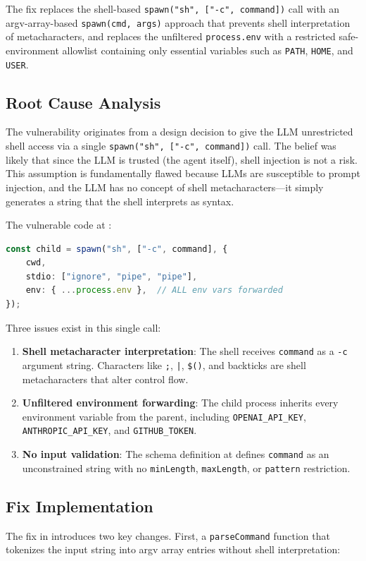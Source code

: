 The fix replaces the shell-based \texttt{spawn("sh", ["-c", command])} call with an argv-array-based \texttt{spawn(cmd, args)} approach that prevents shell interpretation of metacharacters, and replaces the unfiltered \texttt{process.env} with a restricted safe-environment allowlist containing only essential variables such as \texttt{PATH}, \texttt{HOME}, and \texttt{USER}.

\subsection*{Root Cause Analysis}
The vulnerability originates from a design decision to give the LLM unrestricted shell access via a single \texttt{spawn("sh", ["-c", command])} call. The belief was likely that since the LLM is trusted (the agent itself), shell injection is not a risk. This assumption is fundamentally flawed because LLMs are susceptible to prompt injection, and the LLM has no concept of shell metacharacters---it simply generates a string that the shell interprets as syntax.

The vulnerable code at :

\begin{lstlisting}[language=TypeScript]
const child = spawn("sh", ["-c", command], {
    cwd,
    stdio: ["ignore", "pipe", "pipe"],
    env: { ...process.env },  // ALL env vars forwarded
});
\end{lstlisting}

Three issues exist in this single call:
\begin{enumerate}
    \item \textbf{Shell metacharacter interpretation}: The shell receives \texttt{command} as a \texttt{-c} argument string. Characters like \texttt{;}, \texttt{|}, \texttt{\$()}, and backticks are shell metacharacters that alter control flow.
    \item \textbf{Unfiltered environment forwarding}: The child process inherits every environment variable from the parent, including \texttt{OPENAI\_API\_KEY}, \texttt{ANTHROPIC\_API\_KEY}, and \texttt{GITHUB\_TOKEN}.
    \item \textbf{No input validation}: The schema definition at  defines \texttt{command} as an unconstrained string with no \texttt{minLength}, \texttt{maxLength}, or \texttt{pattern} restriction.
\end{enumerate}

\subsection*{Fix Implementation}
The fix in  introduces two key changes. First, a \texttt{parseCommand} function that tokenizes the input string into argv array entries without shell interpretation:

